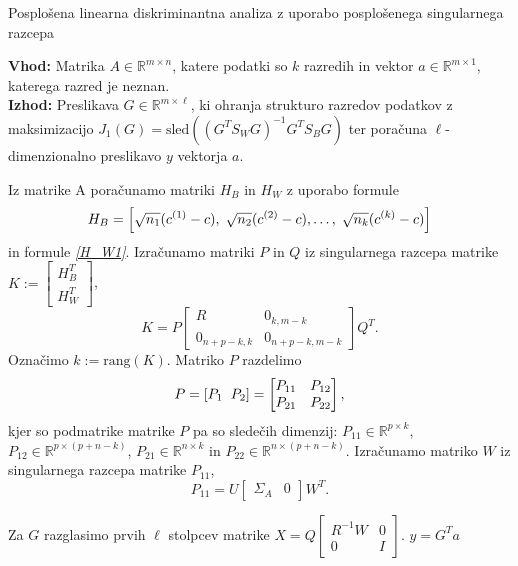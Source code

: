 \documentclass[mat1]{article}
\theoremstyle{definition}
\begin{document}
\begin{algorithm}
\caption{Posplošena linearna diskriminantna analiza z uporabo posplošenega singularnega razcepa}
\hspace*{\algorithmicindent} \textbf{Vhod:} Matrika $A \in \mathbb{R}^{m \times n}$, katere podatki so $k$ razredih in vektor $a \in \mathbb{R}^{m \times 1}$, katerega razred je neznan.
\\
\hspace*{\algorithmicindent} \textbf{Izhod:} Preslikava $G  \in \mathbb{R}^{m \times \ell}$, ki ohranja strukturo razredov podatkov z maksimizacijo $J_1(G) = \text{sled}\left((G^T S_W G)^{-1} G^T S_B G \right)$ ter poračuna $\ell$-dimenzionalno preslikavo $y$ vektorja $a$.
\begin{algorithmic}[1]
    \State Iz matrike A poračunamo matriki $H_B$ in $H_W$ z uporabo formule
      \begin{equation} \label{H_B2}
	H_B = \left[\sqrt{n_1} (c^{(1)} - c), \hspace{1mm} \sqrt{n_2} (c^{(2)} - c),\ldots, \hspace{1mm} \sqrt{n_k} (c^{(k)} - c)\right]
      \end{equation}
      in formule \textit{\eqref{H_W1}}.
    \State Izračunamo matriki $P$ in $Q$ iz singularnega razcepa matrike $K := \begin{bmatrix} H_B^T \\ H_W^T\end{bmatrix}$,
      $$
	K =
        P
	\begin{bmatrix} 
	R & 0_{k, m-k} \\
	0_{n+p-k, k} & 0_{n+p-k, m-k} 
	\end{bmatrix}
	Q^T \text{.} 
      $$
    \State Označimo $k := \text{rang}(K)$.
    \State Matriko $P$ razdelimo 
      $$
	P = \left[P_1 \hspace{2mm} P_2 \right]
		=
	\begin{bmatrix} 
	P_{11} & P_{12} \\
	P_{21} & P_{22} 
	\end{bmatrix},
	$$
	kjer so podmatrike matrike $P$ pa so sledečih dimenzij: $P_{11} \in \mathbb{R}^{p \times k}$, $P_{12} \in 				\mathbb{R}^{p \times (p+n-k)}$, $P_{21} \in \mathbb{R}^{n \times k}$ in $P_{22} \in \mathbb{R}^{n \times (p+n-		k)}$.
    \State Izračunamo matriko $W$ iz singularnega razcepa matrike $P_{11}$,
      $$
	P_{11} =
        U
	\begin{bmatrix} 
	\Sigma_A & 0 
	\end{bmatrix}
	W^T \text{.} 
      $$

    \State Za $G$ razglasimo prvih $\ell$ stolpcev matrike $X = Q
	\begin{bmatrix}
	R^{-1} W & 0 \\
	0 & I 
	\end{bmatrix}$.
    \State $y = G^T a$
  \end{algorithmic}
\end{algorithm}
\end{document}
